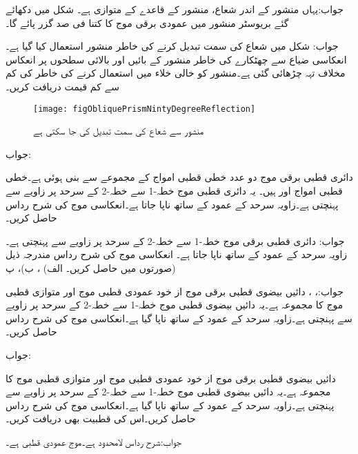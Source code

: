 جواب:یہاں منشور کے اندر شعاع، منشور کے قاعدے کے متوازی ہے۔ 
شکل  میں دکھائے گئے بریوسٹر منشور میں عمودی برقی موج کا کتنا فی صد گزر پائے گا۔

جواب:
شکل  میں شعاع کی سمت  تبدیل کرنے کی خاطر منشور استعمال کیا گیا ہے۔انعکاسی ضیاع سے چھٹکارے کی خاطر منشور کے بائیں اور بالائی سطحوں پر انعکاس مخلاف تہہ چڑھائی گئی ہے۔منشور کو خالی خلاء میں استعمال کرنے کی خاطر  کی کم سے کم قیمت دریافت کریں۔ 
\begin{figure}
\centering
\texttt{[image: figObliquePrismNintyDegreeReflection]}
\caption{منشور سے شعاع کی سمت تبدیل کی جا سکتی ہے}
\label{شکل_ترچھی_منشور_سمت_تبدیل}
\end{figure}

جواب:

دائری قطبی برقی موج دو عدد خطی قطبی امواج کے مجموعے سے بنی ہوئی ہے۔خطی قطبی امواج  اور  ہیں۔ یہ دائری قطبی موج خطہ-1  سے خطہ-2   کے سرحد پر  زاویے سے  پہنچتی ہے۔زاویہ سرحد کے عمود کے ساتھ ناپا جاتا ہے۔انعکاسی موج کی شرح رداس حاصل کریں۔

جواب:
دائری قطبی برقی موج خطہ-1  سے خطہ-2   کے سرحد پر  زاویے سے  پہنچتی ہے۔زاویہ سرحد کے عمود کے ساتھ ناپا جاتا ہے۔ انعکاسی موج کی شرح رداس مندرجہ ذیل صورتوں میں حاصل کریں۔ الف) ،
 ب)، پ) 

جواب:، ، 
دائیں بیضوی قطبی برقی موج از خود عمودی قطبی موج   اور متوازی قطبی موج   کا مجموعہ ہے۔یہ دائیں بیضوی قطبی موج خطہ-1  سے خطہ-2   کے سرحد  پر  زاویے سے  پہنچتی ہے۔زاویہ سرحد کے عمود کے ساتھ ناپا گیا ہے۔انعکاسی موج کی شرح رداس حاصل کریں۔

جواب:

دائیں بیضوی قطبی برقی موج از خود عمودی قطبی موج   اور متوازی قطبی موج   کا مجموعہ ہے۔یہ دائیں بیضوی قطبی موج خطہ-1  سے خطہ-2   کے سرحد  پر  زاویے سے  پہنچتی ہے۔زاویہ سرحد کے عمود کے ساتھ ناپا گیا ہے۔انعکاسی موج کی شرح رداس حاصل کریں۔اس کی قطبیت بھی دریافت کریں۔

جواب:شرح رداس لامحدود ہے۔موج عمودی قطبی ہے۔
